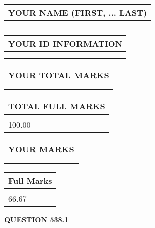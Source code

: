 \documentclass{ctexart}
\begin{document}
   
   
   
\newpage 
\setcounter{page}{ 
   538001 } 
   
   
   
   
\noindent\begin{tabular}{|l|}
\hline
YOUR NAME (FIRST, ... LAST)  \\
\hline
 \\ 
 \\ 
\hline
\end{tabular}
\hspace{0.05in} \begin{tabular}{|l|}
\hline
 YOUR   ID   INFORMATION  \\
\hline
 \\ 
 \\ 
\hline
\end{tabular}
   
   
\vspace{0.2in}\noindent\begin{tabular}{|l|}
\hline
YOUR TOTAL MARKS  \\
\hline
 \\ 
 \\ 
\hline
\end{tabular}
\hspace{0.05in} \begin{tabular}{|l|}
\hline
TOTAL FULL MARKS  \\
\hline
 \\ 
100.00 \\
\hline
\end{tabular}
   
   
 \vspace{0.2in}
 
 
 
 
   
   
  
\vspace{0.2in}
  
\noindent\begin{tabular}{|l|}
\hline
 YOUR MARKS  \\
\hline
 \\ 
 \\ 
\hline
\end{tabular}
\hspace{0.05in} \begin{tabular}{|l|}
\hline
 Full Marks  \\
\hline
 \\ 
66.67 \\
\hline
\end{tabular}
{\textbf{\Large{QUESTION
538.1 
}}}
  
\end{document}
